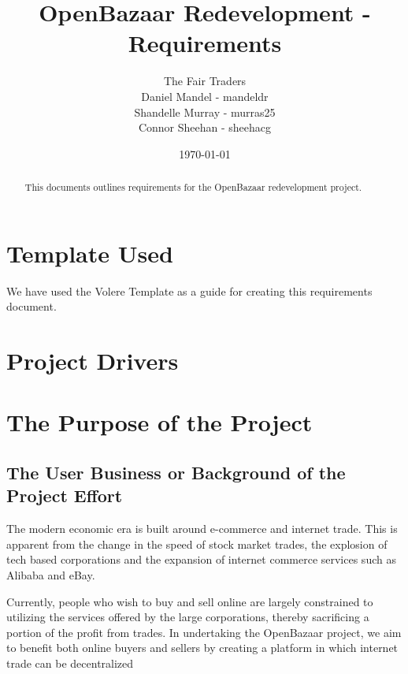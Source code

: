 \documentclass{article}
\begin{document}
\title{OpenBazaar Redevelopment - Requirements}
\author{The Fair Traders \\ Daniel Mandel - mandeldr \\ Shandelle Murray - murras25 \\ Connor Sheehan - sheehacg}
\date{\today}
\maketitle
\tableofcontents
{}

\section*{Template Used}
We have used the Volere Template as a guide for creating this requirements document.

\begin{abstract}
This documents outlines requirements for the OpenBazaar redevelopment project.
\end{abstract}

\section*{Project Drivers}

\section{The Purpose of the Project}

\subsection{The User Business or Background of the Project Effort}

The modern economic era is built around e-commerce and internet trade. This is apparent from the change in the speed of stock market trades, the explosion of tech based corporations and the expansion of internet commerce services such as Alibaba and eBay.

Currently, people who wish to buy and sell online are largely constrained to utilizing the services offered by the large corporations, thereby sacrificing a portion of the profit from trades. In undertaking the OpenBazaar project, we aim to benefit both online buyers and sellers by creating a platform in which internet trade can be decentralized
\end{document}
